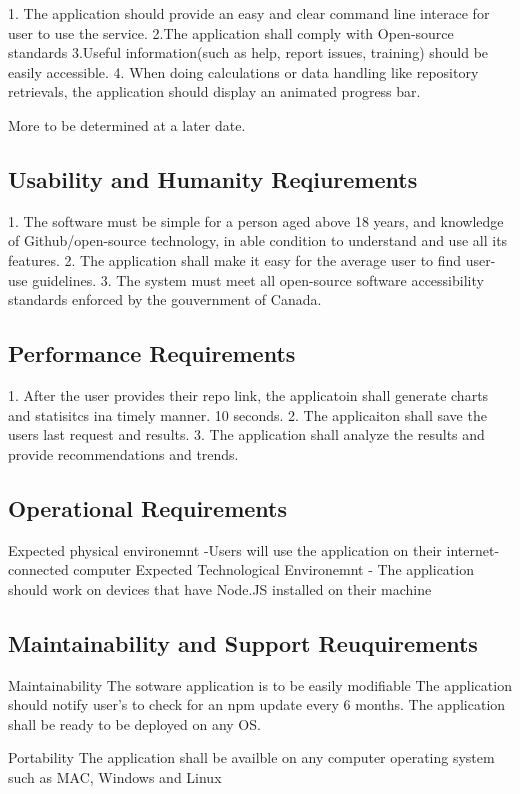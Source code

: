 \documentclass{article}
\begin{document}
1. The application should provide an easy and clear command line interace for user to use the service.
2.The application shall comply with Open-source standards
3.Useful information(such as help, report issues, training) should be easily accessible.
4. When doing calculations or  data handling like repository retrievals, the application should display an animated progress bar. 

More to be determined at a later date. 

\subsection{Usability and Humanity Reqiurements}
1. The software must be simple for a person aged above 18 years, and knowledge of Github/open-source technology,  in able condition to understand and use all its features.
2. The application shall make it easy for the average user to find user-use guidelines.
3. The system must meet all open-source software accessibility standards enforced by the gouvernment of Canada. 

\subsection{Performance Requirements}
1. After the user provides their repo link, the applicatoin shall generate charts and statisitcs ina timely manner.  10 seconds. 
2. The applicaiton shall save the users last request and results. 
3. The application shall analyze the results and provide recommendations and trends. 

\subsection{Operational Requirements}
Expected physical environemnt 
-Users will use the application on their internet-connected computer 
Expected Technological Environemnt 
- The application should work on devices that have Node.JS installed on their machine 

\subsection{Maintainability and Support Reuquirements}
Maintainability 
The sotware application is to be easily modifiable
The application should notify user's to check for an npm update every 6 months. 
The application shall be ready to be deployed on any OS. 

Portability 
The application shall be availble on any computer operating system such as MAC, Windows and Linux
\end{document}
